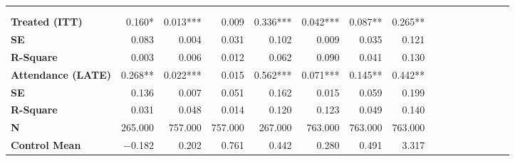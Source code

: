 \begin{tabular}{@{\extracolsep{5pt}}lrrrrrrrrrrrrrrr}
\toprule
&  &  &  &  &  &  &  \\
{\bf } &  &  &  &  &  &  &  \\
\hline
{\bf Treated (ITT)} & 0.160*\phantom{**} & 0.013*** & 0.009\phantom{***} & 0.336*** & 0.042*** & 0.087**\phantom{*} & 0.265**\phantom{*} \\
{\bf SE} & 0.083\phantom{***} & 0.004\phantom{***} & 0.031\phantom{***} & 0.102\phantom{***} & 0.009\phantom{***} & 0.035\phantom{***} & 0.121\phantom{***} \\
{\bf R-Square} & 0.003\phantom{***} & 0.006\phantom{***} & 0.012\phantom{***} & 0.062\phantom{***} & 0.090\phantom{***} & 0.041\phantom{***} & 0.130\phantom{***} \\
{\bf Attendance (LATE)} & 0.268**\phantom{*} & 0.022*** & 0.015\phantom{***} & 0.562*** & 0.071*** & 0.145**\phantom{*} & 0.442**\phantom{*} \\
{\bf SE} & 0.136\phantom{***} & 0.007\phantom{***} & 0.051\phantom{***} & 0.162\phantom{***} & 0.015\phantom{***} & 0.059\phantom{***} & 0.199\phantom{***} \\
{\bf R-Square} & 0.031\phantom{***} & 0.048\phantom{***} & 0.014\phantom{***} & 0.120\phantom{***} & 0.123\phantom{***} & 0.049\phantom{***} & 0.140\phantom{***} \\
{\bf N} & 265.000\phantom{***} & 757.000\phantom{***} & 757.000\phantom{***} & 267.000\phantom{***} & 763.000\phantom{***} & 763.000\phantom{***} & 763.000\phantom{***} \\
{\bf Control Mean} & $-$0.182\phantom{***} & 0.202\phantom{***} & 0.761\phantom{***} & 0.442\phantom{***} & 0.280\phantom{***} & 0.491\phantom{***} & 3.317\phantom{***} \\
\hline
\end{tabular}
